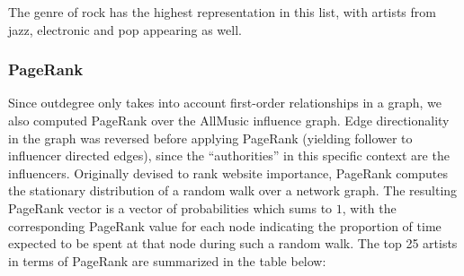 The genre of rock has the highest representation in this list, with artists from jazz, electronic and pop appearing as well.

\subsubsection*{PageRank}
Since outdegree only takes into account first-order relationships in a graph, we also computed PageRank \cite{page1999pagerank} over the AllMusic influence graph. Edge directionality in the graph was reversed before applying PageRank (yielding follower to influencer directed edges), since the ``authorities'' in this specific context are the influencers. Originally devised to rank website importance, PageRank computes the stationary distribution of a random walk over a network graph. The resulting PageRank vector is a vector of probabilities which sums to $1$, with the corresponding PageRank value for each node indicating the proportion of time expected to be spent at that node during such a random walk. The top 25 artists in terms of PageRank are summarized in the table below:


